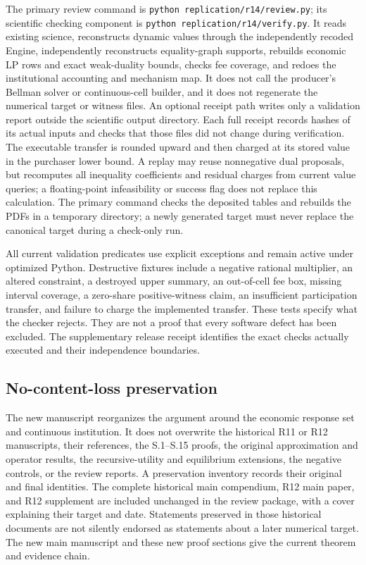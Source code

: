 The primary review command is \texttt{python replication/r14/review.py}; its scientific checking component is \texttt{python replication/r14/verify.py}. It reads existing science, reconstructs dynamic values through the independently recoded Engine, independently reconstructs equality-graph supports, rebuilds economic LP rows and exact weak-duality bounds, checks fee coverage, and redoes the institutional accounting and mechanism map. It does not call the producer's Bellman solver or continuous-cell builder, and it does not regenerate the numerical target or witness files. An optional receipt path writes only a validation report outside the scientific output directory. Each full receipt records hashes of its actual inputs and checks that those files did not change during verification. The executable transfer is rounded upward and then charged at its stored value in the purchaser lower bound. A replay may reuse nonnegative dual proposals, but recomputes all inequality coefficients and residual charges from current value queries; a floating-point infeasibility or success flag does not replace this calculation. The primary command checks the deposited tables and rebuilds the PDFs in a temporary directory; a newly generated target must never replace the canonical target during a check-only run.

All current validation predicates use explicit exceptions and remain active under optimized Python. Destructive fixtures include a negative rational multiplier, an altered constraint, a destroyed upper summary, an out-of-cell fee box, missing interval coverage, a zero-share positive-witness claim, an insufficient participation transfer, and failure to charge the implemented transfer. These tests specify what the checker rejects. They are not a proof that every software defect has been excluded. The supplementary release receipt identifies the exact checks actually executed and their independence boundaries.

\subsection{No-content-loss preservation}
The new manuscript reorganizes the argument around the economic response set and continuous institution. It does not overwrite the historical R11 or R12 manuscripts, their references, the S.1--S.15 proofs, the original approximation and operator results, the recursive-utility and equilibrium extensions, the negative controls, or the review reports. A preservation inventory records their original and final identities. The complete historical main compendium, R12 main paper, and R12 supplement are included unchanged in the review package, with a cover explaining their target and date. Statements preserved in those historical documents are not silently endorsed as statements about a later numerical target. The new main manuscript and these new proof sections give the current theorem and evidence chain.

